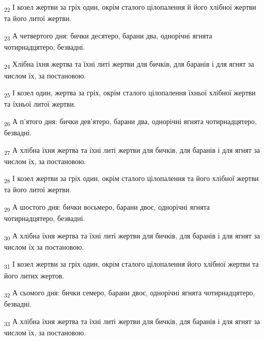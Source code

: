 \begin{tcolorbox}
\textsubscript{22} І козел жертви за гріх один, окрім сталого цілопалення й його хлібної жертви та його литої жертви.
\end{tcolorbox}
\begin{tcolorbox}
\textsubscript{23} А четвертого дня: бички десятеро, барани два, однорічні ягнята чотирнадцятеро, безвадні.
\end{tcolorbox}
\begin{tcolorbox}
\textsubscript{24} Хлібна їхня жертва та їхні литі жертви для бичків, для баранів і для ягнят за числом їх, за постановою.
\end{tcolorbox}
\begin{tcolorbox}
\textsubscript{25} І козел один, жертва за гріх, окрім сталого цілопалення їхньої хлібної жертви та їхньої литої жертви.
\end{tcolorbox}
\begin{tcolorbox}
\textsubscript{26} А п'ятого дня: бички дев'ятеро, барани два, однорічні ягнята чотирнадцятеро, безвадні.
\end{tcolorbox}
\begin{tcolorbox}
\textsubscript{27} А хлібна їхня жертва та їхні литі жертви для бичків, для баранів і для ягнят за числом їх, за постановою.
\end{tcolorbox}
\begin{tcolorbox}
\textsubscript{28} І козел жертви за гріх один, окрім сталого цілопалення та його хлібної жертви та його литої жертви.
\end{tcolorbox}
\begin{tcolorbox}
\textsubscript{29} А шостого дня: бички восьмеро, барани двоє, однорічні ягнята чотирнадцятеро, безвадні.
\end{tcolorbox}
\begin{tcolorbox}
\textsubscript{30} А хлібна їхня жертва та їхні литі жертви для бичків, для баранів і для ягнят за числом їх за постановою.
\end{tcolorbox}
\begin{tcolorbox}
\textsubscript{31} І козел жертви за гріх один, окрім сталого цілопалення його хлібної жертви та його литих жертов.
\end{tcolorbox}
\begin{tcolorbox}
\textsubscript{32} А сьомого дня: бички семеро, барани двоє, однорічні ягнята чотирнадцятеро, безвадні.
\end{tcolorbox}
\begin{tcolorbox}
\textsubscript{33} А хлібна їхня жертва та їхні литі жертви для бичків, для баранів і для ягнят за числом їх, за постановою.
\end{tcolorbox}
